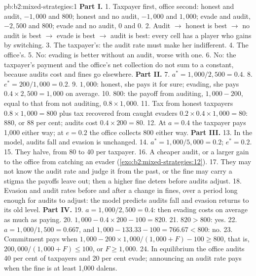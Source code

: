 \begin{solution}{pb:b2:mixed-strategies:1}
\textbf{Part I.}
1. Taxpayer first, office second: honest and audit, $-1{,}000$ and 800; honest and no audit, $-1{,}000$ and
$1{,}000$; evade and audit, $-2{,}500$ and 800; evade and no audit, 0 and 0.
2. Audit $\to$ honest is best $\to$ no audit is best $\to$ evade is best $\to$ audit is best: every cell has a player who
gains by switching.
3. The taxpayer's: the audit rate must make her indifferent.
4. The office's.
5. No: evading is better without an audit, worse with one.
6. No: the taxpayer's payment and the office's net collection do not sum to a constant, because audits cost
and fines go elsewhere.
\textbf{Part II.}
7. $a^* = 1{,}000/2{,}500 = 0.4$.
8. $e^* = 200/1{,}000 = 0.2$.
9. $1{,}000$: honest, she pays it for sure; evading, she pays $0.4 \times 2{,}500 = 1{,}000$ on average.
10. 800: the payoff from auditing, $1{,}000 - 200$, equal to that from not auditing, $0.8 \times 1{,}000$.
11. Tax from honest taxpayers $0.8 \times 1{,}000 = 800$ plus tax recovered from caught evaders $0.2 \times 0.4 \times 1{,}000 =
80$: 880, or 88 per cent; audits cost $0.4 \times 200 = 80$.
12. At $a = 0.4$ the taxpayer pays 1{,}000 either way; at $e = 0.2$ the office collects 800 either way.
\textbf{Part III.}
13. In the model, audits fall and evasion is unchanged.
14. $a^* = 1{,}000/5{,}000 = 0.2$; $e^* = 0.2$.
15. They halve, from 80 to 40 per taxpayer.
16. A cheaper audit, or a larger gain to the office from catching an evader (\cref{exo:b2:mixed-strategies:12}).
17. They may not know the audit rate and judge it from the past, or the fine may carry a stigma the payoffs leave
out; then a higher fine deters before audits adjust.
18. Evasion and audit rates before and after a change in fines, over a period long enough for audits to adjust:
the model predicts audits fall and evasion returns to its old level.
\textbf{Part IV.}
19. $a = 1{,}000/2{,}500 = 0.4$: then evading costs on average as much as paying.
20. $1{,}000 - 0.4 \times 200 - 100 = 820$.
21. $820 > 800$: yes.
22. $a = 1{,}000/1{,}500 = 0.667$, and $1{,}000 - 133.33 - 100 = 766.67 < 800$: no.
23. Commitment pays when $1{,}000 - 200 \times 1{,}000/(1{,}000 + F) - 100 \ge 800$, that is, $200{,}000/(1{,}000 + F) \le 100$, or $F \ge
1{,}000$.
24. In equilibrium the office audits 40 per cent of taxpayers and 20 per cent evade; announcing an audit rate pays
when the fine is at least 1{,}000 dalens.
\end{solution}
